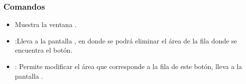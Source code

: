 \subsubsection{Comandos}
\begin{itemize}
 \item {} Muestra la ventana .
 \item {}:Lleva a la pantalla , en donde se podrá eliminar el área de la fila donde se encuentra el botón. 
 \item {}: Permite modificar el área que corresponde a la fila de este botón, lleva a la pantalla .

\end{itemize}


